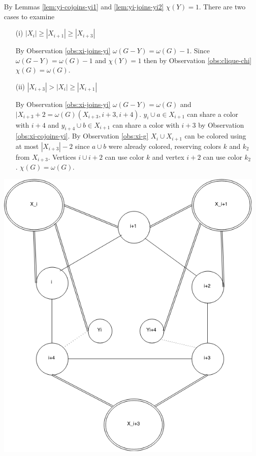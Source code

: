\documentclass[12pt]{article}
\begin{document}
\begin{minipage}{0.5\textwidth}%
	 By Lemmas \ref{lem:yi-cojoins-yi1} and \ref{lem:yi-joins-yi2} $\chi(Y) = 1$. There are two cases to examine
	\begin{itemize}
	\item[(i)]
	$|X_{i}| \geq  |X_{i+1}| \geq |X_{i+3}|$

	By Observation \ref{obs:xi-joins-yi} $\omega(G - Y) = \omega(G) - 1$. Since $\omega(G - Y) = \omega(G) - 1$ and $\chi(Y) = 1$ then by Observation \ref{obs:clique-chi} $\chi(G) = \omega(G)$.

	\item[(ii)]
	$|X_{i+3}| > |X_{i}| \geq |X_{i+1}|$

	By Observation \ref{obs:xi-joins-yi} $\omega(G - Y) = \omega(G)$ and $|X_{i+3} + 2 = \omega(G) (X_{i+3}, i+3, i+4)$. $y_i \cup a \in X_{i+1}$ can share a color with $i+4$ and $y_{i+4} \cup b \in X_{i+1}$ can share a color with $i+3$ by Observation \ref{obs:xi-cojoins-yi}. By Observation \ref{obs:xi-g} $X_i \cup X_{i+1}$ can be colored using at most $|X_{i+3}| - 2$ since $a \cup b$ were already colored, reserving colors $k$ and $k_2$ from $X_{i+3}$. Vertices $i \cup i+2$ can use color $k$ and vertex $i+2$ can use color $k_2$. $\chi(G) = \omega(G)$.
	\end{itemize}
\end{minipage}
\hfill
\begin{minipage}{0.5\textwidth}\raggedleft
	\includegraphics[width=\linewidth]{Yi-Yi4.png}
\end{minipage}
\clearpage
\end{document}

